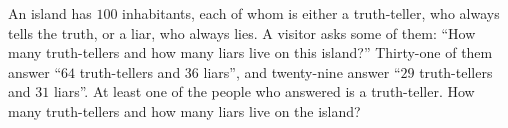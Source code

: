 An island has $100$ inhabitants, each of whom is either a truth-teller, who always tells the truth, or a liar, who always lies. A visitor asks some of them: ``How many truth-tellers and how many liars live on this island?'' Thirty-one of them answer ``$64$ truth-tellers and $36$ liars'', and twenty-nine answer ``$29$ truth-tellers and $31$ liars''. At least one of the people who answered is a truth-teller. How many truth-tellers and how many liars live on the island?

